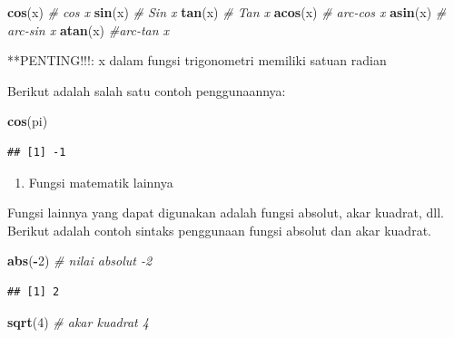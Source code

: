 \documentclass[12pt,]{krantz}
\newenvironment{Shaded}{\begin{snugshade}}{\end{snugshade}}
\newcommand{\CommentTok}[1]{\textcolor[rgb]{0.56,0.35,0.01}{\textit{#1}}}
\newcommand{\DecValTok}[1]{\textcolor[rgb]{0.00,0.00,0.81}{#1}}
\newcommand{\KeywordTok}[1]{\textcolor[rgb]{0.13,0.29,0.53}{\textbf{#1}}}
\newcommand{\NormalTok}[1]{#1}
\newcommand{\OperatorTok}[1]{\textcolor[rgb]{0.81,0.36,0.00}{\textbf{#1}}}
\providecommand{\tightlist}{%
  \setlength{\itemsep}{0pt}\setlength{\parskip}{0pt}}
\renewenvironment{quote}{\begin{VF}}{\end{VF}}
\begin{document}
\begin{Shaded}
\begin{Highlighting}[]
\KeywordTok{cos}\NormalTok{(x) }\CommentTok{# cos x}
\KeywordTok{sin}\NormalTok{(x) }\CommentTok{# Sin x}
\KeywordTok{tan}\NormalTok{(x) }\CommentTok{# Tan x}
\KeywordTok{acos}\NormalTok{(x) }\CommentTok{# arc-cos x}
\KeywordTok{asin}\NormalTok{(x) }\CommentTok{# arc-sin x}
\KeywordTok{atan}\NormalTok{(x) }\CommentTok{#arc-tan x}
\end{Highlighting}
\end{Shaded}

\begin{quote}
**PENTING!!!: x dalam fungsi trigonometri memiliki satuan radian
\end{quote}

Berikut adalah salah satu contoh penggunaannya:

\begin{Shaded}
\begin{Highlighting}[]
\KeywordTok{cos}\NormalTok{(pi)}
\end{Highlighting}
\end{Shaded}

\begin{verbatim}
## [1] -1
\end{verbatim}

\begin{enumerate}
\def\labelenumi{\arabic{enumi}.}
\setcounter{enumi}{2}
\tightlist
\item
  Fungsi matematik lainnya
\end{enumerate}

Fungsi lainnya yang dapat digunakan adalah fungsi absolut, akar kuadrat, dll. Berikut adalah contoh sintaks penggunaan fungsi absolut dan akar kuadrat.

\begin{Shaded}
\begin{Highlighting}[]
\KeywordTok{abs}\NormalTok{(}\OperatorTok{-}\DecValTok{2}\NormalTok{) }\CommentTok{# nilai absolut -2}
\end{Highlighting}
\end{Shaded}

\begin{verbatim}
## [1] 2
\end{verbatim}

\begin{Shaded}
\begin{Highlighting}[]
\KeywordTok{sqrt}\NormalTok{(}\DecValTok{4}\NormalTok{) }\CommentTok{# akar kuadrat 4}
\end{Highlighting}
\end{Shaded}
\end{document}
